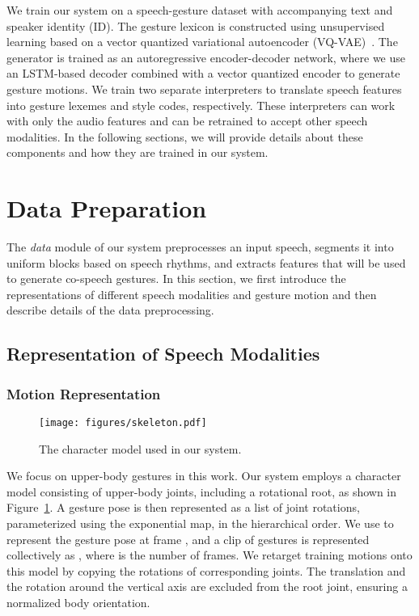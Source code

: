 \documentclass[acmtog,authorversion]{acmart}
\newcommand{\fig}{Figure{}~}
\begin{document}
We train our system on a speech-gesture dataset with accompanying text and speaker identity (ID). The gesture lexicon is constructed using unsupervised learning based on a vector quantized variational autoencoder (VQ-VAE)~\cite{oord2017neural}. The generator is trained as an autoregressive encoder-decoder network, where we use an LSTM-based decoder combined with a vector quantized encoder to generate gesture motions. We train two separate interpreters to translate speech features into gesture lexemes and style codes, respectively. These interpreters can work with only the audio features and can be retrained to accept other speech modalities. In the following sections, we will provide details about these components and how they are trained in our system.
 \section{Data Preparation}
\label{sec:data_preparation}
The \emph{data} module of our system preprocesses an input speech, segments it into uniform blocks based on speech rhythms, and extracts features that will be used to generate co-speech gestures. In this section, we first introduce the representations of different speech modalities and gesture motion and then describe details of the data preprocessing.

\subsection{Representation of Speech Modalities}

\subsubsection{Motion Representation}
\begin{figure}[t]
    \centering
    \texttt{[image: figures/skeleton.pdf]}
    \caption{The character model used in our system.}
    \Description{}
    \label{fig:character_model}
\end{figure}
We focus on upper-body gestures in this work. Our system employs a character model consisting of  upper-body joints, including a rotational root, as shown in \fig\ref{fig:character_model}. A gesture pose is then represented as a list of joint rotations, parameterized using the exponential map, in the hierarchical order. We use  to represent the gesture pose at frame , and a clip of gestures is  represented collectively as , where  is the number of frames. We retarget training motions onto this model by copying the rotations of corresponding joints. The translation and the rotation around the vertical axis are excluded from the root joint, ensuring a normalized body orientation.
\end{document}
